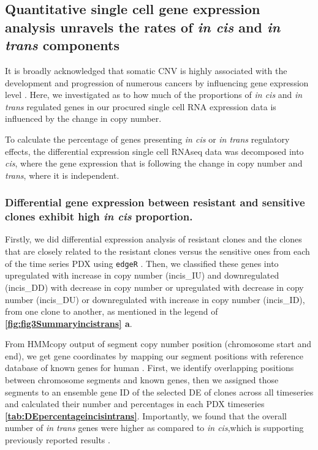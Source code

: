 \subsection{Quantitative single cell gene expression analysis unravels the rates of \textit{in cis} and \textit{in trans} components}

It is broadly acknowledged that somatic CNV is highly associated with the development and progression of numerous cancers by influencing gene expression level \cite{yang2017prame, gut2018sox2}. 
Here, we investigated as to how much of the proportions of \textit{in cis} and \textit{in trans} regulated genes in our procured single cell RNA expression data is influenced by the change in copy number.

To calculate the percentage of genes presenting \textit{in cis} or \textit{in trans} regulatory effects, the differential expression single cell RNAseq data was decomposed into \textit{cis}, where the gene expression that is following the change in copy number and \textit{trans}, where it is independent.



\subsubsection{Differential gene expression between resistant and sensitive clones exhibit high \textit{in cis} proportion.}

Firstly, we did differential expression analysis of resistant clones and the clones that are closely related to the resistant clones versus the sensitive ones from each of the time series PDX using \texttt{edgeR} \cite{robinson2010edger}. Then, we classified these genes into upregulated with increase in copy number (incis\_IU) and downregulated (incis\_DD) with decrease in copy number or upregulated with decrease in copy number (incis\_DU) or downregulated with increase in copy number (incis\_ID), from one clone to another, as mentioned in the legend of \textbf{\autoref{fig:fig3Summaryincistrans} a}.

From HMMcopy output of segment copy number position (chromosome start and end), we get gene coordinates by mapping our segment positions with reference database of known genes for human  \cite{carlson2015txdb}. First, we identify overlapping positions between chromosome segments and known genes, then we assigned those segments to an ensemble gene ID \cite{rainer2019ensembldb} of the  selected \ac{DE} of clones across all timeseries and calculated their number and percentages in each PDX timeseries  \textbf{\autoref{tab:DEpercentageincisintrans}}. Importantly, we found that the overall number of \textit{in trans} genes were higher as compared to \textit{in cis},which is supporting previously reported results \cite{shao2019copy}. 


